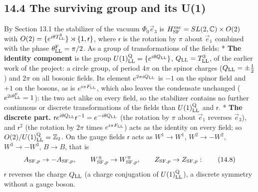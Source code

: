 \documentclass[
  10pt,
]{article}
\begin{document}
\hypertarget{the-surviving-group-and-its-u1}{%
\subsection{14.4 The surviving group and its
U(1)}\label{the-surviving-group-and-its-u1}}

By Section 13.1 the stabilizer of the vacuum \(\Phi_0\vec e_3\) is
\(H^{\rm vac}_{\rm SF}=SL(2,\mathbb C)\times O(2)\) with
\(O(2)=\{e^{i\theta T^3_{\rm LL}}\}\rtimes\{\mathsf 1,\mathsf r\}\),
where \(\mathsf r\) is the rotation by \(\pi\) about \(\vec e_1\)
combined with the phase \(\theta^{\rm F}_{\rm LL}=\pi/2\). As a group of
transformations of the fields: * \textbf{The identity component} is the
group \(U(1)^{\rm Q}_{\rm LL}=\{e^{i\theta Q_{\rm LL}}\}\),
\(Q_{\rm LL}=T^3_{\rm LL}\), of the earlier work of the project: a
circle group, of period \(4\pi\) on the spinor charges
(\(Q_{\rm LL}=\pm\tfrac12\)) and \(2\pi\) on all bosonic fields. Its
element \(e^{2\pi iQ_{\rm LL}}\) is \(-1\) on the spinor field and
\(+1\) on the bosons, as is \(e^{i\pi F_{\rm LL}}\), which also leaves
the condensate unchanged (\(e^{2i\theta^{\rm F}_{\rm LL}}=1\)): the two
act alike on every field, so the stabilizer contains no further
continuous or discrete transformations of the fields than
\(U(1)^{\rm Q}_{\rm LL}\) and \(\mathsf r\). * \textbf{The discrete
part.}
\(\mathsf r e^{i\theta Q_{\rm LL}}\mathsf r^{-1}=e^{-i\theta Q_{\rm LL}}\)
(the rotation by \(\pi\) about \(\vec e_1\) reverses \(\vec e_3\)), and
\(\mathsf r^2\) (the rotation by \(2\pi\) times \(e^{i\pi F_{\rm LL}}\))
acts as the identity on every field; so
\(O(2)/U(1)^{\rm Q}_{\rm LL}=\mathbb Z_2\). On the gauge fields
\(\mathsf r\) acts as \(W^1\to W^1\), \(W^2\to-W^2\), \(W^3\to-W^3\),
\(B\to B\), that is
\[A_{{\rm SF},p}\to-A_{{\rm SF},p},\qquad W^\pm_{{\rm SF},p}\to W^\mp_{{\rm SF},p},\qquad Z_{{\rm SF},p}\to Z_{{\rm SF},p}:\tag{14.8}\]
\(\mathsf r\) reverses the charge \(Q_{\rm LL}\) (a charge conjugation
of \(U(1)^{\rm Q}_{\rm LL}\)), a discrete symmetry without a gauge
boson.
\end{document}
